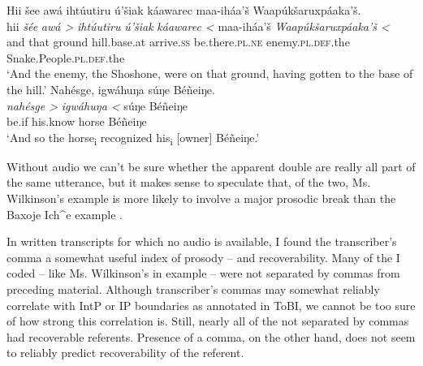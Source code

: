 \documentclass[output=paper]{LSP/langsci}
\begin{document}
\ea\label{multiplepostverbal}
\ea\label{wilkinsonmultiplepostverbal}
Hii šee awá ihtúutiru ú’šiak káawarec maa-iháa’š Waapúkšaruxpáaka’š.\footnotemark\\
\gll	hii 		\emph{šée} 		\emph{awá >}		\emph{ihtúutiru} 			\emph{ú’šiak} 		\emph{káawarec <}	maa-iháa’š 				\emph{Waapúkšaruxpáaka’š <}\\
	and 		that	 		ground 			hill.base.at	 			arrive.\textsc{ss} 		be.there.\textsc{pl.ne}	enemy.\textsc{pl.def}.the 		Snake.People.\textsc{pl.def}.the\\
\glt	`And the enemy, the Shoshone, were on that ground, having gotten to the base of the hill.'
\ex\label{baxojemultiplepostverbal}
Nahésge, igwáhuŋa súŋe Béñeiŋe.\footnotemark\\
\gll	\emph{nahésge >}	\emph{igwáhuŋa <}	súŋe 		Béñeiŋe\\
	be.if 			his.know 			horse 		Béñeiŋe\\
\glt	`And so the horse\textsubscript{i} recognized his\textsubscript{i} [owner] Béñeiŋe.'
\z\z

Without audio we can’t be sure whether the apparent double  are really all part of the same utterance, but it makes sense to speculate that, of the two, Ms. Wilkinson’s example  is more likely to involve a major prosodic break than the Baxoje Ich\^{}e example .

In written transcripts for which no audio is available, I found the transcriber’s comma a somewhat useful index of prosody -- and recoverability. Many of the  I coded -- like Ms. Wilkinson’s in example  -- were not separated by commas from preceding material. Although transcriber’s commas may somewhat reliably correlate with IntP or IP boundaries as annotated in ToBI, we cannot be too sure of how strong this correlation is. Still, nearly all of the  not separated by commas had recoverable referents. Presence of a comma, on the other hand, does not seem to reliably predict recoverability of the referent.
\end{document}
